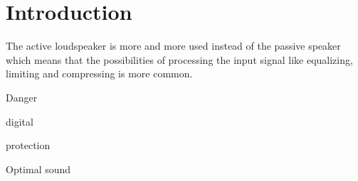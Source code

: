 \chapter{Introduction}
The active loudspeaker is more and more used instead of the passive speaker which means that the possibilities of processing the input signal like equalizing, limiting and compressing is more common.     

Danger

digital

protection

Optimal sound 




% 


